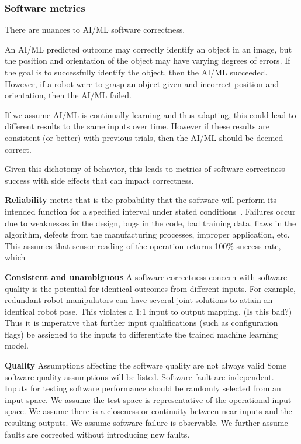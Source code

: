  
\subsubsection{Software metrics}
There are nuances to AI/ML software correctness. 

An AI/ML predicted outcome  may correctly identify an object in an image, but the position and orientation of the object may have varying degrees of errors. If the goal is to successfully identify the object, then the AI/ML succeeded. However, if a robot were to grasp an object given and incorrect position and orientation, then the AI/ML failed. 

If we assume AI/ML is continually learning and thus adapting, this could lead to  different results to the same inputs over time. However if these results are consistent (or better) with previous trials, then the AI/ML should be deemed correct.

Given this dichotomy  of behavior, this leads to metrics of software correctness success with side effects that can impact correctness.

\begin{description}
\item \textbf{Reliability} 
metric that is the probability that the software will perform its intended function for a specified interval under stated conditions~\cite{reliabilityweb}. Failures occur due to weaknesses in the design, bugs in the code, bad training data, flaws in the algorithm, defects from the manufacturing processes, improper application, etc. This assumes that sensor reading of the operation returns 100\% success rate, which 

\item \textbf{Consistent and unambiguous} 
A software correctness concern with software quality is the potential for identical outcomes from different inputs. For example, redundant robot manipulators can have several joint solutions to attain an identical robot pose. This violates a 1:1 input to output mapping. (Is this bad?) Thus it is imperative that further input qualifications (such as configuration flags) be assigned to the inputs to differentiate the trained machine learning model.

\item \textbf{Quality}
Assumptions affecting the software quality are not always valid  Some software quality assumptions will be listed. Software fault are independent. Inputs for testing software performance should be randomly selected  from an input space. We assume the test space is representative of the operational input space. We assume there is a closeness or continuity between near inputs and the resulting outputs. We assume software failure is observable. We further assume faults are corrected without introducing new faults.


\end{description}


